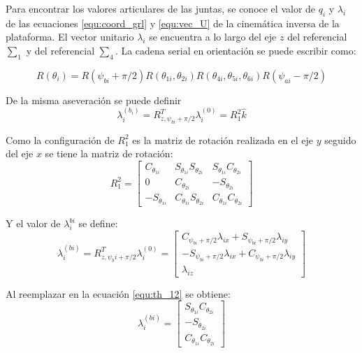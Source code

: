 Para encontrar los valores articulares de las juntas, se conoce el valor de $q_i$ y $\lambda_i$ de las ecuaciones \ref{equ:coord_grl} y \ref{equ:vec_U} de la cinemática inversa de la plataforma. El vector unitario $\lambda_i$ se encuentra a lo largo del eje $z$ del referencial $\sum_1$ y del referencial $\sum_4$. La cadena serial en orientación se puede escribir como:

\begin{equation} \label{equ:th_12-46}
R(\theta_i) = R(\psi_{bi}+\pi/2)R(\theta_{1i},\theta_{2i})R(\theta_{4i},\theta_{5i},\theta_{6i})R(\psi_{ai}-\pi/2)
\end{equation}

De la misma aseveración se puede definir
\begin{equation} \label{equ:th_12}
\lambda_i^{(b_i)} = R^T_{z,\psi_{bi}+\pi/2} \lambda_i^{(0)} =R_1^2 \hat{k}
\end{equation}

Como la configuración de $R_1^2$ es la matriz de rotación realizada en el eje $y$ seguido del eje $x$ se tiene la matriz de rotación:
\begin{equation}
R_1^2 = \begin{bmatrix}
C_{\theta_{1i}} & S_{\theta_{1i}} S_{\theta_{2i}} & S_{\theta_{1i}} C_{\theta_{2i}}\\
0 & C_{\theta_{2i}} & -S_{\theta_{2i}}\\
-S_{\theta_{1i}} & C_{\theta_{1i}} S_{\theta_{2i}} & C_{\theta_{1i}} C_{\theta_{2i}}
\end{bmatrix}
\end{equation}

Y el valor de $\lambda_i^{bi}$ se define:
\begin{equation}
\lambda_i^{(bi)} = R^T_{z,\psi_bi+\pi/2} \lambda_i^{(0)} = \begin{bmatrix}
C_{\psi_{bi}+\pi/2} \lambda_{ix} + S_{\psi_{bi}+\pi/2} \lambda_{iy} \\
-S_{\psi_{bi}+\pi/2} \lambda_{ix} + C_{\psi_{bi}+\pi/2} \lambda_{iy} \\
\lambda_{iz}
\end{bmatrix}
\end{equation}

Al reemplazar en la ecuación \ref{equ:th_12} se obtiene:
\begin{equation}
\lambda_i^{(bi)} = \begin{bmatrix}
S_{\theta_{1i}} C_{\theta_{2i}}\\
-S_{\theta_{2i}}\\
C_{\theta_{1i}} C_{\theta_{2i}}
\end{bmatrix}
\end{equation}

